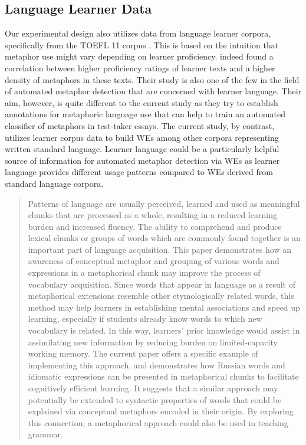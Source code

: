 \documentclass[11pt,a4paper]{article}
\begin{document}
\subsection{Language Learner Data}

Our experimental design also utilizes data from language learner corpora, specifically from the TOEFL 11 corpus \cite{ETS2:ETS202331}. This is based on the intuition that metaphor use might vary depending on learner proficiency.
indeed found a correlation between higher proficiency ratings of learner texts and a higher density of metaphors in these texts. Their study is also one of the few in the field of automated metaphor detection that are concerned with learner language. Their aim, however, is quite different to the current study as they try to establish annotations for metaphoric language use that can help to train an automated classifier of metaphors in test-taker essays. The current study, by contrast, utilizes learner corpus data to build WEs among other corpora representing written standard language. Learner language could be a particularly helpful source of information for automated metaphor detection via WEs as learner language provides different usage patterns compared to WEs derived from standard language corpora.

\begin{quotation}
Patterns of language are usually perceived, learned and used as meaningful chunks that are processed as a whole, resulting in a reduced learning burden and increased fluency. The ability to comprehend and produce lexical chunks or groups of words which are commonly found together is an important part of language acquisition. This paper demonstrates how an awareness of conceptual metaphor and grouping of various words and expressions in a metaphorical chunk may improve the process of vocabulary acquisition. Since words that appear in language as a result of metaphorical extensions resemble other etymologically related words, this method may help learners in establishing mental associations and speed up learning, especially if students already know words to which new vocabulary is related. In this way, learners' prior knowledge would assist in assimilating new information by reducing burden on limited-capacity working memory. The current paper offers a specific example of implementing this approach, and demonstrates how Russian words and idiomatic expressions can be presented in metaphorical chunks to facilitate cognitively efficient learning. It suggests that a similar approach may potentially be extended to syntactic properties of words that could be explained via conceptual metaphors encoded in their origin. By exploring this connection, a metaphorical approach could also be used in teaching grammar.
\end{quotation}
\cite{Kalyuga2008}
\end{document}

